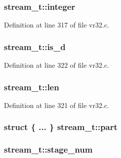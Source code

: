 \subsubsection[{\texorpdfstring{integer}{integer}}]{ stream\+\_\+t\+::integer}\hypertarget{structstream__t_acc952a91b88789c20bb3aac4fac13a56}{}\label{structstream__t_acc952a91b88789c20bb3aac4fac13a56}


Definition at line 317 of file vr32.\+c.

\subsubsection[{\texorpdfstring{is\+\_\+d}{is_d}}]{ stream\+\_\+t\+::is\+\_\+d}\hypertarget{structstream__t_a57458edeff5b2a372c764c28612baf1a}{}\label{structstream__t_a57458edeff5b2a372c764c28612baf1a}


Definition at line 322 of file vr32.\+c.

\subsubsection[{\texorpdfstring{len}{len}}]{ stream\+\_\+t\+::len}\hypertarget{structstream__t_a03b3f0d8ec51ba97798f73a1362dd3fe}{}\label{structstream__t_a03b3f0d8ec51ba97798f73a1362dd3fe}


Definition at line 321 of file vr32.\+c.

\subsubsection[{\texorpdfstring{part}{part}}]{\setlength{\rightskip}{0pt plus 5cm}struct \{ ... \}   stream\+\_\+t\+::part}\hypertarget{structstream__t_a077b0dc83ed4a7cbcaa23534871fe69b}{}\label{structstream__t_a077b0dc83ed4a7cbcaa23534871fe69b}
\subsubsection[{\texorpdfstring{stage\+\_\+num}{stage_num}}]{ stream\+\_\+t\+::stage\+\_\+num}\hypertarget{structstream__t_a37e6dc6284b2229dbfada6e29f82a698}{}\label{structstream__t_a37e6dc6284b2229dbfada6e29f82a698}


